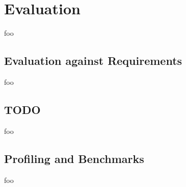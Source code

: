 
%

\section{Evaluation}
\label{sec:evaluation}


foo


\subsection{Evaluation against Requirements}

foo


\subsection{TODO}

foo


\subsection{Profiling and Benchmarks}

foo
